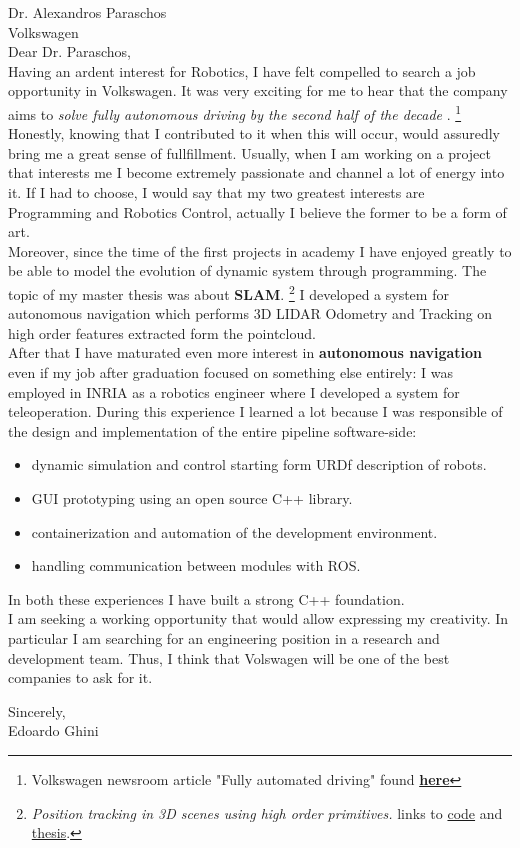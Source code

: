 \begin{FlushLeft}
Dr. Alexandros Paraschos\\

Volkswagen\\

\vspace{2cm}
Dear Dr. Paraschos,\\

Having an ardent interest for Robotics, I have felt compelled to search a job opportunity in Volkswagen.
  It was very exciting for me to hear that the company aims to \textit{solve fully autonomous driving by the second half of the decade }.
  \footnote{Volkswagen newsroom article "Fully automated driving" found \href{ https://www.volkswagen-newsroom.com/en/fully-automated-driving-3633}{\textbf{here}}}\\\smallskip
Honestly, knowing that I contributed to it when this will occur, would assuredly bring me a great sense of fullfillment.
Usually, when I am working on a project that interests me I become extremely passionate and channel a lot of energy into it.
If I had to choose, I would say that my two greatest interests are Programming and Robotics Control, actually I believe the former to be a form of art.\\\smallskip
Moreover, since the time of the first projects in academy I have enjoyed greatly  to be able to model the evolution of dynamic system through programming.
  The topic of my master thesis was about \textbf{SLAM}.
  \footnote{ \textit{Position tracking in 3D scenes using high order primitives.} \quad links to \href{https://github.com/dinies/3D-Lidar-Odometry-and-Tracking}{code} and  \href{https://github.com/dinies/MasterThesis-ArtificialIntelligence-Robotics/blob/master/MaterThesis_Edoardo_Ghini.pdf}{thesis}.}
I developed a system for autonomous navigation which performs 3D LIDAR Odometry and Tracking on high order features extracted form the pointcloud.\\\smallskip
After that I have maturated even more interest in \textbf{autonomous navigation } even if my job after graduation focused on something else entirely: I was employed in INRIA as a robotics engineer where I developed  a system for teleoperation.
During this experience I learned a lot because I was responsible of the design and implementation of the entire pipeline software-side:
\begin{itemize}
  \item  dynamic simulation and control starting form URDf description of robots.
  \item  GUI prototyping using an open source C++ library.
  \item  containerization and automation of the development environment.
  \item  handling communication between modules with ROS.
\end{itemize}
In both these experiences I have built a strong C++ foundation.\\\smallskip
I am seeking a working opportunity that would allow expressing my creativity.
In particular I am searching for an engineering position in a research and development team.
Thus, I think that Volswagen will be one of the best companies to ask for it.


\bigskip
Sincerely,\\
Edoardo Ghini
\end{FlushLeft}

